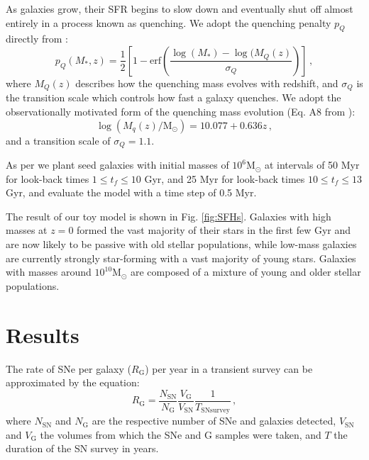 \documentclass[fleqn,usenatbib]{mnras}
\begin{document}
As galaxies grow, their SFR begins to slow down and eventually shut off almost entirely in a process known as quenching. We adopt the quenching penalty $p_Q$ directly from \citet{Childress2014}:
\begin{equation}
    p_Q(M_*,z) = \frac{1}{2}\left[1 - \mathrm{erf}\left(\frac{\log(M_*) - \log(M_Q(z)}{\sigma_Q}\right)\right]\,,
\end{equation}
where $M_Q(z)$ describes how the quenching mass evolves with redshift, and $\sigma_Q$ is the transition scale which controls how fast a galaxy quenches. We adopt the observationally motivated form of the quenching mass evolution (Eq. A8 from \citealt{Childress2014}):
\begin{equation}
    \log(M_q(z)/\mathrm{M}_{\odot}) = 10.077 + 0.636z \,, 
\end{equation}
and a transition scale of $\sigma_Q = 1.1$. 

As per \citet{Childress2014} we plant seed galaxies with initial masses of $10^6 \mathrm{M}_{\odot}$ at intervals of 50 Myr for look-back times $1 \leq t_f \leq 10$ Gyr, and 25 Myr for look-back times $10 \leq t_f \leq 13$ Gyr, and evaluate the model with a time step of 0.5 Myr.

The result of our toy model is shown in Fig. \ref{fig:SFHs}. Galaxies with high masses at $z=0$ formed the vast majority of their stars in the first few Gyr and are now likely to be passive with old stellar populations, while low-mass galaxies are currently strongly star-forming with a vast majority of young stars. Galaxies with masses around $10^{10} \mathrm{M}_{\odot}$ are composed of a mixture of young and older stellar populations.


\section{Results}
\label{sec:rates}
The rate of SNe per galaxy ($R_{\mathrm{G}}$) per year in a transient survey can be approximated by the equation:
\begin{equation}
    R_{\mathrm{G}} = \frac{N_{\mathrm{SN}}}{N_{\mathrm{G}}} \frac{V_{\mathrm{G}}}{V_{\mathrm{SN}}}\frac{1}{T_{\mathrm{SN  survey}}}\,,
\label{eq:rate1}
\end{equation}
where $N_{\mathrm{SN}}$ and $N_{\mathrm{G}}$ are the respective number of SNe and galaxies detected, $V_{\mathrm{SN}}$ and $V_{\mathrm{G}}$ the volumes from which the SNe and G samples were taken, and $T$ the duration of the SN survey in years. 
\end{document}
